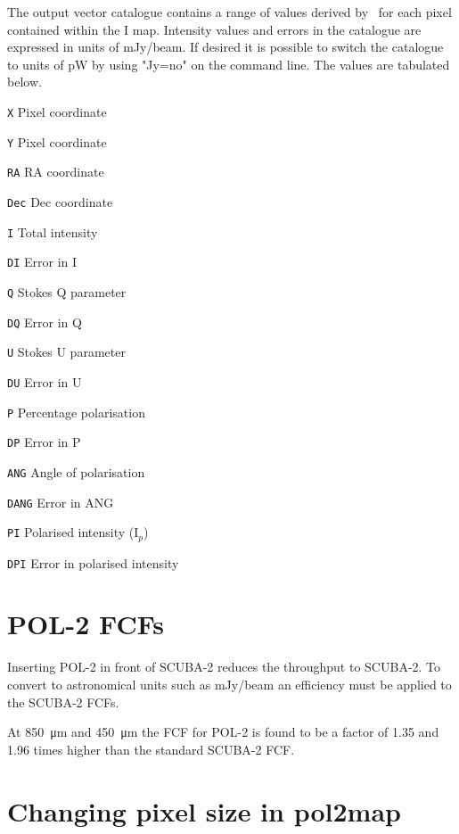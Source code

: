 The output vector catalogue contains a range of values derived by
\poltwomap\ for each pixel contained within the I map. Intensity values and
errors in the
catalogue are expressed in units of mJy/beam.  If desired it is possible
to switch the catalogue to units of pW by using "Jy=no" on the 
command line.  The values are tabulated below.

\begin{aligndesc}
\item[\texttt{X}] Pixel coordinate
\item[\texttt{Y}] Pixel coordinate
\item[\texttt{RA}] RA coordinate
\item[\texttt{Dec}] Dec coordinate
\item[\texttt{I}] Total intensity
\item[\texttt{DI}] Error in I
\item[\texttt{Q}] Stokes Q parameter
\item[\texttt{DQ}] Error in Q
\item[\texttt{U}] Stokes U parameter
\item[\texttt{DU}] Error in U
\item[\texttt{P}] Percentage polarisation
\item[\texttt{DP}] Error in P
\item[\texttt{ANG}] Angle of polarisation
\item[\texttt{DANG}] Error in ANG
\item[\texttt{PI}] Polarised intensity (I$_{p}$)
\item[\texttt{DPI}] Error in polarised intensity
\end{aligndesc}


\section{POL-2 FCFs}
\label{sec:pol2map-fcf}

Inserting POL-2 in front of SCUBA-2 reduces the throughput to SCUBA-2.
To convert to astronomical units such as mJy/beam an efficiency must be
applied to the SCUBA-2 FCFs.

At \SI{850}{\micro\metre} and \SI{450}{\micro\metre} the FCF for POL-2
is found to be a factor of 1.35 and 1.96 times higher than the
standard SCUBA-2 FCF.


\section{Changing pixel size in pol2map}
\label{sec:pol2map-pixelsize}

